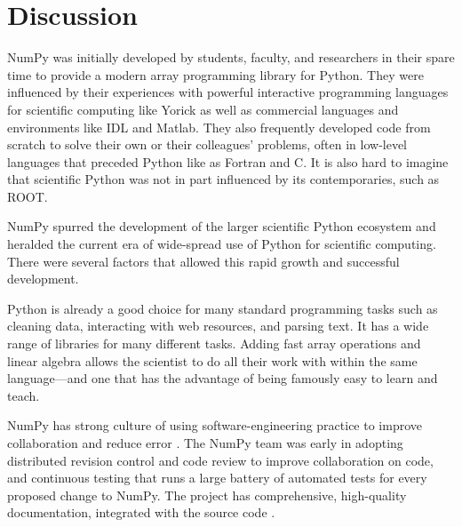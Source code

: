 \section*{Discussion}


NumPy was initially developed by students, faculty, and researchers in their spare time to provide a modern array programming library for Python.  They were influenced by their experiences with powerful interactive programming languages for scientific computing like Yorick \cite{munro1995using} as well as commercial languages and environments like IDL and Matlab.  They also frequently developed code from scratch to solve their own or their colleagues' problems, often in low-level languages that preceded Python like as Fortran \cite{dongarra2008netlib} and C.  It is also hard to imagine that scientific Python was not in part influenced by its contemporaries, such as ROOT.


NumPy spurred the development of the larger scientific Python ecosystem and
heralded the current era of wide-spread use of Python for scientific computing.
There were several factors that allowed this rapid growth and successful
development.

Python is already a good choice for many standard programming tasks such as
cleaning data, interacting with web resources, and parsing text.
It has a wide range of libraries for many different tasks.
Adding fast array operations and linear algebra allows the scientist to do all
their work with within the same language---and one that has the advantage of
being famously easy to learn and teach.

NumPy has strong culture of using software-engineering practice to
improve collaboration and reduce error \cite{millman2014developing}.
The NumPy team was early in adopting distributed revision control and code
review to improve collaboration on code, and continuous testing that runs a
large battery of automated tests for every proposed change to NumPy.
The project has comprehensive, high-quality documentation, integrated with the
source code \cite{vanderwalt2008scipy,harrington2008scipy,harrington2009scipy}.


